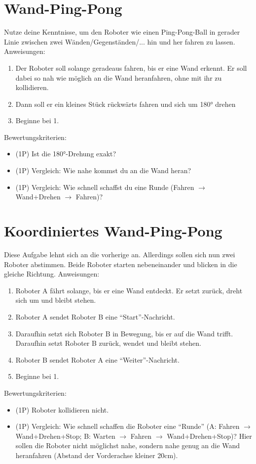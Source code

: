 \documentclass[
	12pt,
	article,
	type=bsc, %
	colorbacktitle,
	instlogo,
	accentcolor=tud1c,
	german,
	twoside
]{tudexercise}
\begin{document}
\newpage
\section{Wand-Ping-Pong}
Nutze deine Kenntnisse, um den Roboter wie einen Ping-Pong-Ball in gerader Linie zwischen zwei Wänden/Gegenständen/... hin und her fahren zu lassen.
Anweisungen:
\begin{enumerate}
\item Der Roboter soll solange geradeaus fahren, bis er eine Wand erkennt. Er soll dabei so nah wie möglich an die Wand heranfahren, ohne mit ihr zu kollidieren.
\item Dann soll er ein kleines Stück rückwärts fahren und sich um 180° drehen
\item Beginne bei 1.
\end{enumerate}

Bewertungskriterien:
\begin{itemize}
\item (1P) Ist die 180°-Drehung exakt?
\item (1P) Vergleich: Wie nahe kommst du an die Wand heran?
\item (1P) Vergleich: Wie schnell schaffst du eine Runde (Fahren $\rightarrow$ Wand+Drehen $\rightarrow$ Fahren)?
\end{itemize}

\section{Koordiniertes Wand-Ping-Pong}
Diese Aufgabe lehnt sich an die vorherige an. Allerdings sollen sich nun zwei Roboter abstimmen. Beide Roboter starten nebeneinander und blicken in die gleiche Richtung.
Anweisungen:
\begin{enumerate}
\item Roboter A fährt solange, bis er eine Wand entdeckt. Er setzt zurück, dreht sich um und bleibt stehen.
\item Roboter A sendet Roboter B eine “Start”-Nachricht.
\item Daraufhin setzt sich Roboter B in Bewegung, bis er auf die Wand trifft. Daraufhin setzt Roboter B zurück, wendet und bleibt stehen.
\item Roboter B sendet Roboter A eine “Weiter”-Nachricht.
\item Beginne bei 1.
\end{enumerate}

Bewertungskriterien:

\begin{itemize}
\item (1P) Roboter kollidieren nicht.
\item (1P) Vergleich: Wie schnell schaffen die Roboter eine “Runde” (A: Fahren $\rightarrow$ Wand+Drehen+Stop; B: Warten $\rightarrow$ Fahren $\rightarrow$ Wand+Drehen+Stop)? Hier sollen die Roboter nicht möglichst nahe, sondern nahe genug an die Wand heranfahren (Abstand der Vorderachse kleiner 20cm).
\end{itemize}
\end{document}
